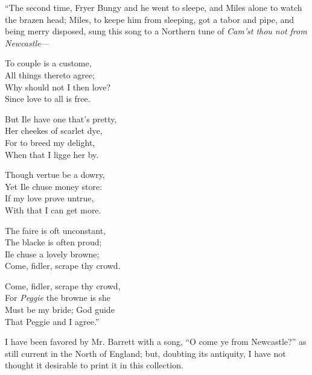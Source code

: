 “The second time, Fryer Bungy and he went to sleepe, and Miles alone to watch
the brazen head; Miles, to keepe him from sleeping, got a tabor and pipe, and being
merry disposed, sung this song to a Northern tune of \textit{Cam’st thou not from Newcastle}—
\begin{dcverse}\begin{altverse}
To couple is a custome,\\
All things thereto agree;\\
Why should not I then love?\\
Since love to all is free.
\end{altverse}

\begin{altverse}
But Ile have one that’s pretty,\\
Her cheekes of scarlet dye,\\
For to breed my delight,\\
When that I ligge her by.
\end{altverse}

\begin{altverse}
Though vertue be a dowry,\\
Yet Ile chuse money store:\\
If my love prove untrue,\\
With that I can get more.
\end{altverse}

\begin{altverse}
The faire is oft unconstant,\\
The blacke is often proud;\\
Ile chuse a lovely browne;\\
Come, fidler, scrape thy crowd.
\end{altverse}

\begin{altverse}
Come, fidler, scrape thy crowd,\\
For \textit{Peggie} the browne is she\\
Must be my bride; God guide\\
That Peggie and I agree.”
\end{altverse}
\end{dcverse}
\pagebreak


I have been favored by Mr. Barrett with a song, “O come ye from Newcastle?”
as still current in the North of England; but, doubting its antiquity, I have not
thought it desirable to print it in this collection.

